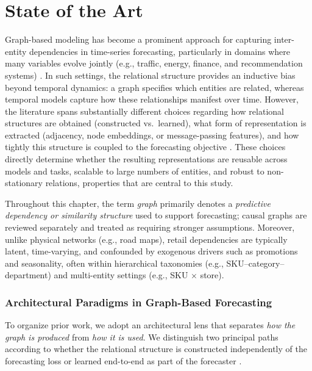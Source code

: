 \chapter{State of the Art}

Graph-based modeling has become a prominent approach for capturing inter-entity dependencies in time-series forecasting, particularly in domains where many variables evolve jointly (e.g., traffic, energy, finance, and recommendation systems) \cite{jin2024survey,li2018dcrnn,yu2018stgcn}. In such settings, the relational structure provides an inductive bias beyond temporal dynamics: a graph specifies which entities are related, whereas temporal models capture how these relationships manifest over time. However, the literature spans substantially different choices regarding how relational structures are obtained (constructed vs.\ learned), what form of representation is extracted (adjacency, node embeddings, or message-passing features), and how tightly this structure is coupled to the forecasting objective \cite{jin2024survey,wu2019graphwavenetdeepspatialtemporal,wu2020connectingdotsmultivariatetime}. These choices directly determine whether the resulting representations are reusable across models and tasks, scalable to large numbers of entities, and robust to non-stationary relations, properties that are central to this study.

Throughout this chapter, the term \emph{graph} primarily denotes a \emph{predictive dependency or similarity structure} used to support forecasting; causal graphs are reviewed separately and treated as requiring stronger assumptions. Moreover, unlike physical networks (e.g., road maps), retail dependencies are typically latent, time-varying, and confounded by exogenous drivers such as promotions and seasonality, often within hierarchical taxonomies (e.g., SKU--category--department) and multi-entity settings (e.g., SKU $\times$ store).

\subsection*{Architectural Paradigms in Graph-Based Forecasting}

To organize prior work, we adopt an architectural lens that separates \emph{how the graph is produced} from \emph{how it is used}. We distinguish two principal paths according to whether the relational structure is constructed independently of the forecasting loss or learned end-to-end as part of the forecaster \cite{jin2024survey}.

